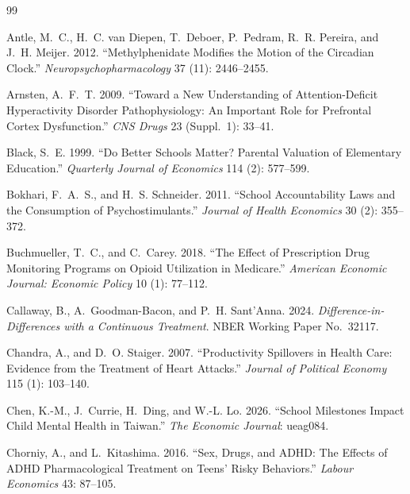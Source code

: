 \documentclass[12pt]{article}
\begin{document}
\newpage
\begin{thebibliography}{99}
\setlength{\itemsep}{0.4em}

Antle, M.~C., H.~C. van Diepen, T.~Deboer, P.~Pedram, R.~R. Pereira, and J.~H. Meijer. 2012. ``Methylphenidate Modifies the Motion of the Circadian Clock.'' \textit{Neuropsychopharmacology} 37 (11): 2446--2455.

Arnsten, A.~F.~T. 2009. ``Toward a New Understanding of Attention-Deficit Hyperactivity Disorder Pathophysiology: An Important Role for Prefrontal Cortex Dysfunction.'' \textit{CNS Drugs} 23 (Suppl.~1): 33--41.

Black, S.~E. 1999. ``Do Better Schools Matter? Parental Valuation of Elementary Education.'' \textit{Quarterly Journal of Economics} 114 (2): 577--599.

Bokhari, F.~A.~S., and H.~S. Schneider. 2011. ``School Accountability Laws and the Consumption of Psychostimulants.'' \textit{Journal of Health Economics} 30 (2): 355--372.

Buchmueller, T.~C., and C.~Carey. 2018. ``The Effect of Prescription Drug Monitoring Programs on Opioid Utilization in Medicare.'' \textit{American Economic Journal: Economic Policy} 10 (1): 77--112.

Callaway, B., A.~Goodman-Bacon, and P.~H. Sant'Anna. 2024. \textit{Difference-in-Differences with a Continuous Treatment}. NBER Working Paper No.~32117.

Chandra, A., and D.~O. Staiger. 2007. ``Productivity Spillovers in Health Care: Evidence from the Treatment of Heart Attacks.'' \textit{Journal of Political Economy} 115 (1): 103--140.

Chen, K.-M., J.~Currie, H.~Ding, and W.-L. Lo. 2026. ``School Milestones Impact Child Mental Health in Taiwan.'' \textit{The Economic Journal}: ueag084.

Chorniy, A., and L.~Kitashima. 2016. ``Sex, Drugs, and ADHD: The Effects of ADHD Pharmacological Treatment on Teens' Risky Behaviors.'' \textit{Labour Economics} 43: 87--105.


\end{thebibliography}
\end{document}
